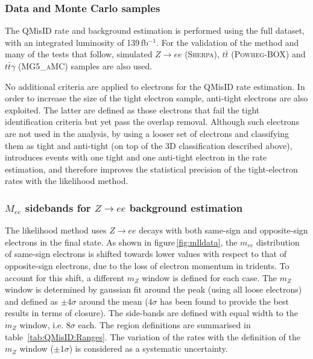 \subsubsection{Data and Monte Carlo samples}
\label{sec:qmisiddata}

The QMisID rate and background estimation is performed using the full dataset, with an integrated luminosity 
of 139\,fb$^{-1}$. For the validation of the method and many of the tests that follow, 
simulated $Z\to ee$ ({\scshape Sherpa}), $t\bar{t}$ (\textsc{Powheg-BOX}) and $t\bar{t}\gamma$ (\textsc{MG5\_aMC}) samples 
are also used.

No additional criteria are applied to electrons for the QMisID rate
estimation. In order to increase the size of the tight electron sample,
anti-tight electrons are also exploited.  
The latter are defined as those electrons that fail the tight identification criteria but yet pass the overlap removal. Although such 
electrons are not used in the analysis, by using a looser set of electrons and classifying them as tight and anti-tight (on top of the 
3D classification described above), introduces events with one tight and one anti-tight electron in the rate estimation, and therefore 
improves the statistical precision of the tight-electron rates with the likelihood method.

\subsubsection{$M_{ee}$ sidebands for $Z\rightarrow ee$ background estimation}
\label{app:sec:AppQMisIDregions}

The likelihood method uses $Z\rightarrow ee$ decays with both same-sign and opposite-sign electrons in the final state. As shown 
in figure\,\ref{fig:mlldata}, the $m_{ee}$ distribution of same-sign electrons is shifted towards lower values with respect to 
that of opposite-sign electrons, due to the loss of electron momentum in tridents. To account for this shift, a different $m_Z$ 
window is defined for each case. The $m_Z$ window is determined by gaussian fit around the peak (using all loose electrons) and 
defined as $\pm 4\sigma$ around the mean ($4\sigma$ has been found to provide the best results in terms of closure). The side-bands 
are defined with equal width to the $m_Z$ window, i.e. $8\sigma$ each. The region definitions are summarised in table~\ref{tab:QMisID:Ranges}.
The variation of the rates with the definition of the $m_Z$ window ($\pm 1\sigma$) is considered as a systematic uncertainty.


